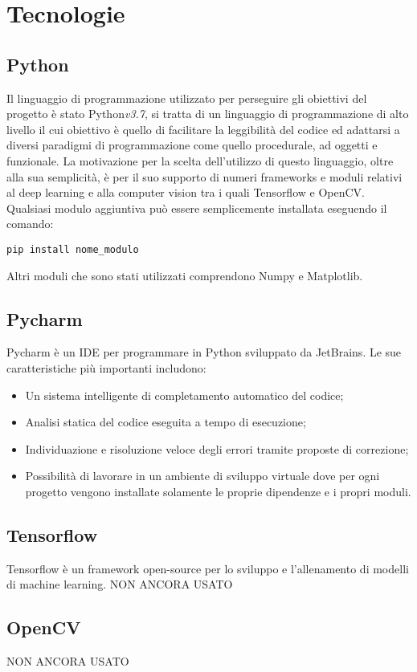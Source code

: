 \section{Tecnologie}
\subsection{Python}
Il linguaggio di programmazione utilizzato per perseguire gli obiettivi del progetto è stato Python\textit{v3.7}, si tratta di un linguaggio di programmazione di alto livello il cui obiettivo è quello di facilitare la leggibilità del codice ed adattarsi a diversi paradigmi di programmazione come quello procedurale, ad oggetti e funzionale. La motivazione per la scelta dell'utilizzo di questo linguaggio, oltre alla sua semplicità, è per il suo supporto di numeri frameworks e moduli relativi al deep learning e alla computer vision tra i quali Tensorflow e OpenCV. Qualsiasi modulo aggiuntiva può essere semplicemente installata eseguendo il comando:
\begin{verbatim}
pip install nome_modulo
\end{verbatim}
Altri moduli che sono stati utilizzati comprendono Numpy e Matplotlib.
\subsection{Pycharm}
Pycharm è un IDE per programmare in Python sviluppato da JetBrains. Le sue caratteristiche più importanti includono: 
\begin{itemize}
\item Un sistema intelligente di completamento automatico del codice;
\item Analisi statica del codice eseguita a tempo di esecuzione;
\item Individuazione e risoluzione veloce degli errori tramite proposte di correzione;
\item Possibilità di lavorare in un ambiente di sviluppo virtuale dove per ogni progetto vengono installate solamente le proprie dipendenze e i propri moduli. 
\end{itemize}
\subsection{Tensorflow}
Tensorflow è un framework open-source per lo sviluppo e l'allenamento di modelli di machine learning. NON ANCORA USATO
\subsection{OpenCV}
NON ANCORA USATO
